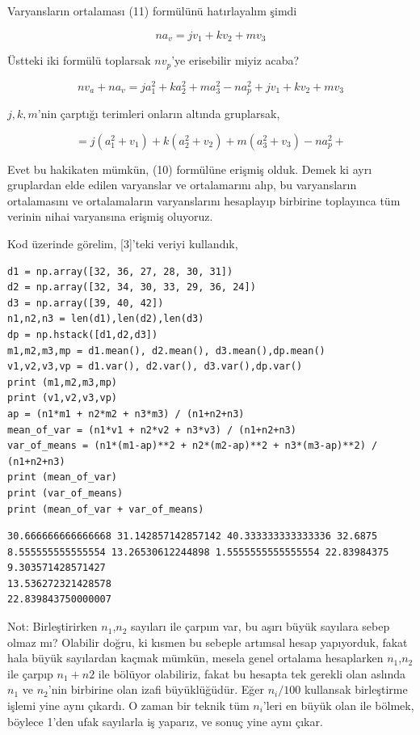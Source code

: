 \documentclass[12pt,fleqn]{article}\usepackage{../../common}
\begin{document}
Varyansların ortalaması (11) formülünü hatırlayalım şimdi

$$
n a_v = j v_1 + k v_2 + m v_3
$$

Üstteki iki formülü toplarsak $n v_p$'ye erisebilir miyiz acaba?

$$
n v_a + n a_v = 
j a_1^2 + k a_2^2 + m a_3^2 - n a_p^2 +
j v_1 + k v_2 + m v_3
$$

$j,k,m$'nin çarptığı terimleri onların altında gruplarsak,

$$
=  j (a_1^2 + v_1) + k (a_2^2 + v_2) + m (a_3^2 + v_3) - n a_p^2 +
$$

Evet bu hakikaten mümkün, (10) formülüne erişmiş olduk. Demek ki ayrı gruplardan
elde edilen varyanslar ve ortalamarını alıp, bu varyansların ortalamasını ve
ortalamaların varyanslarını hesaplayıp birbirine toplayınca tüm verinin
nihai varyansına erişmiş oluyoruz.

Kod üzerinde görelim, [3]'teki veriyi kullandık,

\begin{verbatim}
d1 = np.array([32, 36, 27, 28, 30, 31])
d2 = np.array([32, 34, 30, 33, 29, 36, 24])
d3 = np.array([39, 40, 42])
n1,n2,n3 = len(d1),len(d2),len(d3)
dp = np.hstack([d1,d2,d3])
m1,m2,m3,mp = d1.mean(), d2.mean(), d3.mean(),dp.mean()
v1,v2,v3,vp = d1.var(), d2.var(), d3.var(),dp.var()
print (m1,m2,m3,mp)
print (v1,v2,v3,vp)
ap = (n1*m1 + n2*m2 + n3*m3) / (n1+n2+n3) 
mean_of_var = (n1*v1 + n2*v2 + n3*v3) / (n1+n2+n3) 
var_of_means = (n1*(m1-ap)**2 + n2*(m2-ap)**2 + n3*(m3-ap)**2) / (n1+n2+n3)
print (mean_of_var)
print (var_of_means)
print (mean_of_var + var_of_means)
\end{verbatim}

\begin{verbatim}
30.666666666666668 31.142857142857142 40.333333333333336 32.6875
8.555555555555554 13.26530612244898 1.5555555555555554 22.83984375
9.303571428571427
13.536272321428578
22.839843750000007
\end{verbatim}

Not: Birleştirirken $n_1$,$n_2$ sayıları ile çarpım var, bu aşırı büyük sayılara
sebep olmaz mı? Olabilir doğru, ki kısmen bu sebeple artımsal hesap yapıyorduk,
fakat hala büyük sayılardan kaçmak mümkün, mesela genel ortalama hesaplarken
$n_1$,$n_2$ ile çarpıp $n_1+n2$ ile bölüyor olabiliriz, fakat bu hesapta tek
gerekli olan aslında $n_1$ ve $n_2$'nin birbirine olan izafi büyüklüğüdür. Eğer
$n_i/100$ kullansak birleştirme işlemi yine aynı çıkardı. O zaman bir teknik tüm
$n_i$'leri en büyük olan ile bölmek, böylece 1'den ufak sayılarla iş yaparız, ve
sonuç yine aynı çıkar.
\end{document}
